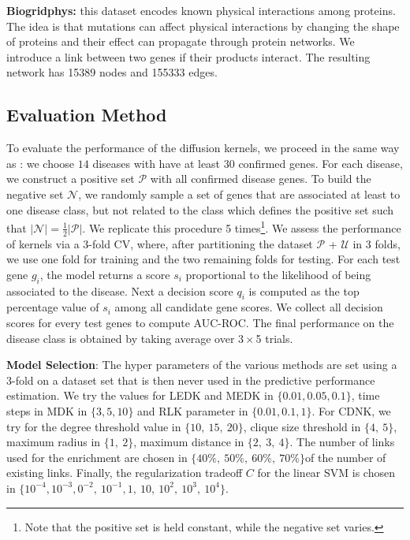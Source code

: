 \textbf{Biogridphys:} this dataset encodes known physical interactions
among proteins. The idea is that mutations can affect physical interactions by
changing the shape of proteins and their effect can propagate through protein
networks. We introduce a link between two genes if their products interact. The resulting network has 15389 nodes and 155333 edges.

\subsection{Evaluation Method}

To evaluate the performance of the diffusion kernels, we proceed in the same
way as \cite{proceeding3}: we choose $14$ diseases with have at least $30$
confirmed genes. For each disease, we construct a positive set $\mathcal{P}$
with all confirmed disease genes. To build the negative set $\mathcal{N}$, we
randomly sample a set of genes that are associated at least to one disease
class, but not related to the class which defines the positive set such that
$\vert \mathcal{N} \vert = \frac{1}{2} \vert \mathcal{P} \vert$. We replicate
this procedure 5 times\footnote{Note that the positive set is held constant,
while the negative set varies.}. We assess the performance of kernels via a
3-fold CV, where, after partitioning  the dataset $\mathcal{P}$ +
$\mathcal{U}$ in 3 folds, we use one fold for training and the two remaining
folds for testing.  For each test gene $g_i$, the model returns a score $s_i$
proportional to the likelihood of being associated to the disease. Next a decision score
$q_i$ is computed as the top percentage value of $s_i$ among all candidate
gene scores. We collect all decision scores for every test genes to compute
AUC-ROC. The final performance on the disease class is obtained by taking
average over $3\times$5 trials.


\textbf{Model Selection}: The hyper parameters of the various methods are
set using a 3-fold on a dataset set that is then never used in the predictive
performance estimation. We try the values for LEDK and MEDK in $\lbrace  0.01,
0.05, 0.1 \rbrace$, time steps in MDK in $\lbrace 3, 5, 10 \rbrace$ and RLK
parameter in $\lbrace 0.01, 0.1, 1 \rbrace$. For CDNK, we try for the degree
threshold value in $\lbrace 10,\ 15,\ 20 \rbrace$, clique size threshold in
$\lbrace 4,\ 5 \rbrace$, maximum radius in $\lbrace 1,\ 2 \rbrace$, maximum
distance in $\lbrace 2,\ 3,\ 4 \rbrace$. 
The number of links used for the enrichment are chosen in $\lbrace 40\%,\ 50\%,\ 60\%,\ 70\% \rbrace$of the number of existing links. 
Finally, the regularization tradeoff $C$ for the linear SVM is chosen in $\lbrace 10^{-4}, 10^{-3}, 0^{-2},\ 10^{-1}, 1,\ 10,\ 10^2, \ 10^3,\ 10^4 \rbrace$.

